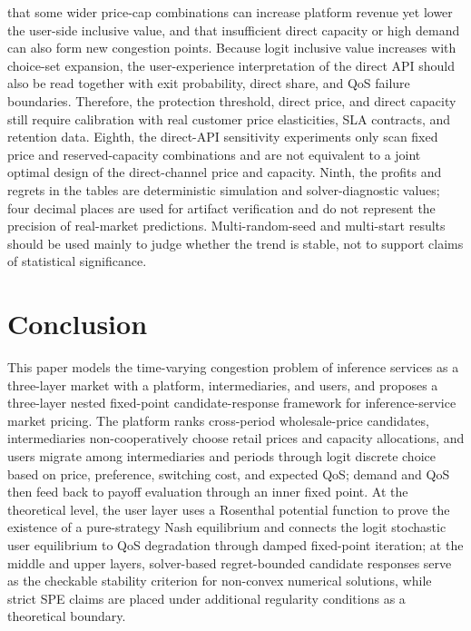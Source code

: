 \documentclass[11pt,a4paper]{article}
\begin{document}
that some wider price-cap combinations can increase platform revenue yet lower the user-side inclusive value, and that insufficient direct capacity or high demand can also form new congestion points. Because logit inclusive value increases with choice-set expansion, the user-experience interpretation of the direct API should also be read together with exit probability, direct share, and QoS failure boundaries. Therefore, the protection threshold, direct price, and direct capacity still require calibration with real customer price elasticities, SLA contracts, and retention data. Eighth, the direct-API sensitivity experiments only scan fixed price and reserved-capacity combinations and are not equivalent to a joint optimal design of the direct-channel price and capacity. Ninth, the profits and regrets in the tables are deterministic simulation and solver-diagnostic values; four decimal places are used for artifact verification and do not represent the precision of real-market predictions. Multi-random-seed and multi-start results should be used mainly to judge whether the trend is stable, not to support claims of statistical significance.

\section{Conclusion}
\label{sec:conclusion}

This paper models the time-varying congestion problem of inference services as a three-layer market with a platform, intermediaries, and users, and proposes a three-layer nested fixed-point candidate-response framework for inference-service market pricing. The platform ranks cross-period wholesale-price candidates, intermediaries non-cooperatively choose retail prices and capacity allocations, and users migrate among intermediaries and periods through logit discrete choice based on price, preference, switching cost, and expected QoS; demand and QoS then feed back to payoff evaluation through an inner fixed point. At the theoretical level, the user layer uses a Rosenthal potential function to prove the existence of a pure-strategy Nash equilibrium and connects the logit stochastic user equilibrium to QoS degradation through damped fixed-point iteration; at the middle and upper layers, solver-based regret-bounded candidate responses serve as the checkable stability criterion for non-convex numerical solutions, while strict SPE claims are placed under additional regularity conditions as a theoretical boundary.
\end{document}
